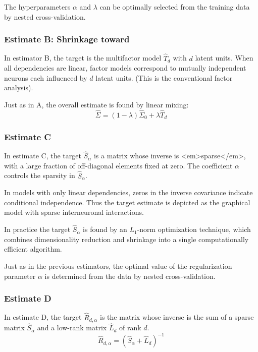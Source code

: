 {The hyperparameters $ \alpha$ and $ \lambda$ can be optimally selected from the training data by nested cross-validation.

\subsubsection*{Estimate B: Shrinkage toward }
In estimator B, the target is the multifactor model $ \hat T_d$ with $ d$ latent units. When all dependencies are linear, factor models correspond to mutually independent neurons each influenced by $ d$ latent units. (This is  the conventional factor analysis).

Just as in A, the overall estimate is found by linear mixing:
\begin{equation}
\hat\Sigma = (1-\lambda)\hat\Sigma_0 + \lambda\hat T_d
\end{equation}

\subsubsection*{Estimate C}
In estimate C, the target $ \hat S_\alpha$ is a matrix whose inverse is <em>sparse</em>, with a large fraction of off-diagonal elements fixed at zero. The coefficient $ \alpha$ controls the sparsity in $ \hat S_\alpha$.

In models with only linear dependencies, zeros in the inverse covariance indicate conditional independence. Thus the target estimate is depicted as the graphical model with sparse interneuronal interactions.

In practice the target $\hat S_\alpha$ is found by an $ L_1$-norm optimization technique, which combines dimensionality reduction and shrinkage into a single computationally efficient algorithm.

Just as in the previous estimators, the optimal value of the regularization parameter $ \alpha$ is determined from the data by nested cross-validation.

\subsubsection*{Estimate D}
In estimate D, the target $\hat R_{d,\alpha}$ is the matrix whose inverse is the sum of a sparse matrix $\hat S_\alpha$ and a low-rank matrix $\hat L_d$ of rank $d$.
\begin{equation}
\hat R_{d,\alpha} = (\hat S_\alpha + \hat L_d)^{-1}
\end{equation}

}
